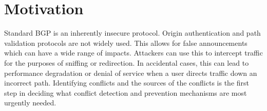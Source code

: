  \section{Motivation}\label{sec:motivation}
 
Standard BGP is an inherently insecure protocol. Origin authentication and path validation protocols are not widely used. This allows for false announcements which can have a wide range of impacts. Attackers can use this to intercept traffic for the purposes of sniffing or redirection. In accidental cases, this can lead to performance degradation or denial of service when a user directs traffic down an incorrect path. Identifying conflicts and the sources of the conflicts is the first step in deciding what conflict detection and prevention mechanisms are most urgently needed.